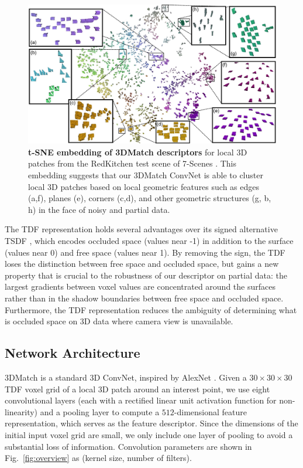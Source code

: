 \documentclass[10pt,twocolumn,letterpaper]{article}
\begin{document}
\begin{figure}[t]
\vspace{-3mm}
\centering
\includegraphics[width=1\linewidth]{images/tsne.jpg}

\caption{{\bf t-SNE embedding of 3DMatch descriptors} for local 3D patches from the RedKitchen test scene of 7-Scenes \cite{newcombe2011kinectfusion}. This embedding suggests that our 3DMatch ConvNet is able to cluster local 3D patches based on local geometric features such as edges (a,f), planes (e), corners (c,d), and other geometric structures (g, b, h) in the face of noisy and partial data.}
\label{fig:tSNE}
\end{figure}

The TDF representation holds several advantages over its signed alternative TSDF \cite{curless1996volumetric},
which encodes occluded space (values near -1) in addition to the surface (values near 0) and free space (values near 1). By removing the sign, the TDF loses the distinction between free space and occluded space, but gains a new property that is crucial to the robustness of our descriptor on partial data: the largest gradients between voxel values are concentrated around the surfaces rather than in the shadow boundaries between free space and occluded space. 
Furthermore, the TDF representation reduces the ambiguity of determining what is occluded space on 3D data where camera view is unavailable.



\subsection{Network Architecture}
3DMatch is a standard 3D ConvNet, inspired by AlexNet \cite{ImageNet}. Given a $30\times{30}\times{30}$ TDF voxel grid of a local 3D patch around an interest point, we use eight convolutional layers (each with a rectified linear unit activation function for non-linearity) and a pooling layer to compute a $512$-dimensional feature representation, which serves as the feature descriptor. Since the dimensions of the initial input voxel grid are small, we only include one layer of pooling to avoid a substantial loss of information. Convolution parameters are shown in Fig.~\ref{fig:overview} as (kernel size, number of filters).
\end{document}
